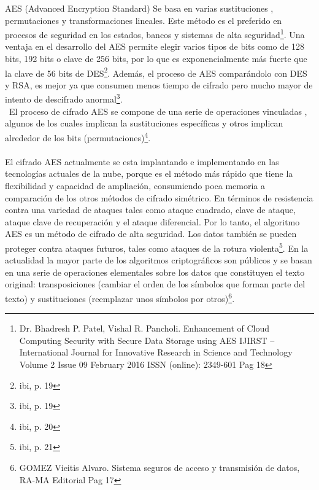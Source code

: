 \documentclass[a4paper,openright,12pt]{book}
\theoremstyle{definition}
\theoremstyle{remark}
\begin{document}
AES (Advanced Encryption Standard) Se basa en varias sustituciones , permutaciones y transformaciones lineales. Este método es el preferido en procesos de seguridad en los estados, bancos y sistemas de alta seguridad\footnote{Dr. Bhadresh P. Patel, Vishal R. Pancholi. Enhancement of Cloud Computing Security with Secure Data Storage using AES IJIRST –International Journal for Innovative Research in Science and Technology Volume 2 Issue 09 February 2016 ISSN (online): 2349-601 Pag 18}. Una ventaja en el desarrollo del AES permite elegir varios tipos de bits como de 128 bits, 192 bits o clave de 256 bits, por lo que es exponencialmente más fuerte que la clave de 56 bits de DES\footnote{ibi, p. 19}. Además, el proceso de AES comparándolo con DES y RSA, es mejor ya que consumen menos tiempo de cifrado pero mucho mayor de intento de descifrado anormal\footnote{ibi, p. 19}.\\\
El proceso de cifrado AES se compone de una serie de operaciones vinculadas , algunos de los cuales implican la sustituciones específicas y otros implican alrededor de los bits (permutaciones)\footnote{ibi, p.  20}. \\\\ El cifrado AES actualmente se esta implantando e implementando en las tecnologías actuales de la nube, porque es el método más rápido que tiene la flexibilidad y capacidad de ampliación, consumiendo poca memoria a comparación de los otros métodos de cifrado simétrico. En términos de resistencia contra una variedad de ataques tales como ataque cuadrado, clave de ataque, ataque clave de recuperación y el ataque diferencial. Por lo tanto, el algoritmo AES es un método de cifrado de alta seguridad. Los datos también se pueden proteger contra ataques futuros, tales como ataques de la rotura violenta\footnote{ibi, p. 21}. En la actualidad la mayor parte de los algoritmos criptográficos son públicos y se basan en una serie de operaciones elementales sobre los datos que constituyen el texto original: transposiciones (cambiar el orden de los símbolos que forman parte del texto) y sustituciones  (reemplazar unos símbolos por otros)\footnote{GOMEZ Vieitis Alvaro. Sistema seguros de acceso y transmisión de datos, RA-MA Editorial Pag 17}.
\end{document}
